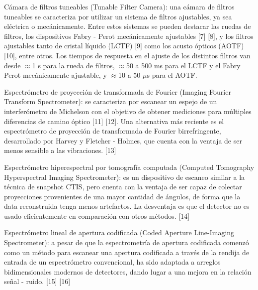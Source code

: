\documentclass{ctuthesis}
\begin{document}
Cámara de filtros tuneables (Tunable Filter Camera): una cámara de filtros tuneables se caracteriza por utilizar un sistema de filtros ajustables, ya sea eléctrica o mecánicamente. Entre estos sistemas se pueden destacar las ruedas de filtros, los dispositivos Fabry - Perot mecánicamente ajustables [7] [8], y los filtros ajustables tanto de cristal líquido (LCTF) [9] como los acusto ópticos (AOTF) [10], entre otros. Los tiempos de respuesta en el ajuste de los distintos filtros van desde $\approx$1 s para la rueda de filtros, $\approx$50 a 500 ms para el LCTF y el Fabry Perot mecánicamente ajustable, y $\approx$10 a 50 $\mu$s para el AOTF.

Espectrómetro de proyección de transformada de Fourier (Imaging Fourier Transform Spectrometer): se caracteriza por escanear un espejo de un interferómetro de Michelson con el objetivo de obtener mediciones para múltiples diferencias de camino óptico [11] [12]. Una alternativa más reciente es el espectrómetro de proyección de transformada de Fourier birrefringente, desarrollado por Harvey y Fletcher - Holmes, que cuenta con la ventaja de ser menos sensible a las vibraciones. [13]

Espectrómetro hiperespectral por tomografía computada (Computed Tomography Hyperspectral Imaging Spectrometer): es un dispositivo de escaneo similar a la técnica de snapshot CTIS, pero cuenta con la ventaja de ser capaz de colectar proyecciones provenientes de una mayor cantidad de ángulos, de forma que la data reconstruida tenga menos artefactos. La desventaja es que el detector no es usado eficientemente en comparación con otros métodos. [14]

Espectrómetro lineal de apertura codificada (Coded Aperture Line-Imaging Spectrometer): a pesar de que la espectrometría de apertura codificada comenzó como un método para escanear una apertura codificada a través de la rendija de entrada de un espectrómetro convencional, ha sido adaptada a arreglos bidimensionales modernos de detectores, dando lugar a una mejora en la relación señal - ruido. [15] [16]
\end{document}
